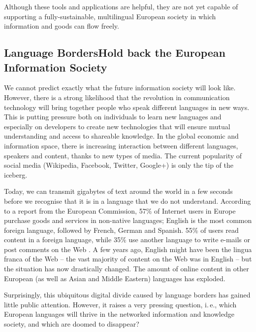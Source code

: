 \begin{multicols}{2}
Although these tools and applications are helpful, they are not yet capable of supporting a fully-sustainable, multilingual European society in which information and goods can flow freely.

\subsection[Language Borders Hold back the European Information Society]{Language Borders\newline Hold back the European Information Society}

We cannot predict exactly what the future information society will look like. However, there is a strong likelihood that the revolution in communication technology will bring together people who speak different languages in new ways. This is putting pressure both on individuals to learn new languages and especially on developers to create new technologies that will ensure mutual understanding and access to shareable knowledge. In the global economic and information space, there is increasing interaction between different languages, speakers and content, thanks to new types of media. The current popularity of social media (Wikipedia, Facebook, Twitter, Google+) is only the tip of the iceberg.


Today, we can transmit gigabytes of text around the world in a few seconds before we recognise that it is in a language that we do not understand. According to a report from the European Commission, 57\% of Internet users in Europe purchase goods and services in non-native languages; English is the most common foreign language, followed by French, German and Spanish. 55\% of users read content in a foreign language, while 35\% use another language to write e-mails or post comments on the Web \cite{EC1}. A few years ago, English might have been the lingua franca of the Web -- the vast majority of content on the Web was in English -- but the situation has now drastically changed. The amount of online content in other European (as well as Asian and Middle Eastern) languages has exploded.

Surprisingly, this ubiquitous digital divide caused by language borders has gained little public attention. However, it raises a very pressing question, i.\,e., which European languages will thrive in the networked information and knowledge society, and which are doomed to disappear?


\end{multicols}
